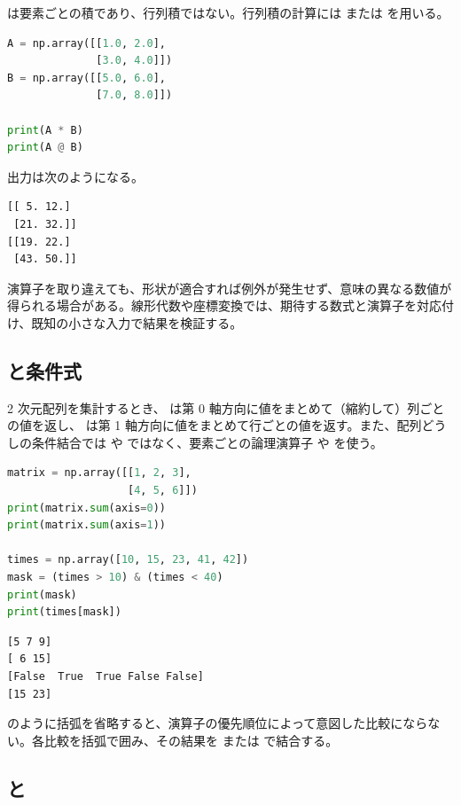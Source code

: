 \code{*} は要素ごとの積であり、行列積ではない。行列積の計算には  または  を用いる。

\begin{lstlisting}[language=Python]
A = np.array([[1.0, 2.0],
              [3.0, 4.0]])
B = np.array([[5.0, 6.0],
              [7.0, 8.0]])

print(A * B)
print(A @ B)
\end{lstlisting}

出力は次のようになる。

\begin{lstlisting}[numbers=none, xleftmargin=2\zw]
[[ 5. 12.]
 [21. 32.]]
[[19. 22.]
 [43. 50.]]
\end{lstlisting}

演算子を取り違えても、形状が適合すれば例外が発生せず、意味の異なる数値が得られる場合がある。線形代数や座標変換では、期待する数式と演算子を対応付け、既知の小さな入力で結果を検証する。

\subsection{ と条件式}

2 次元配列を集計するとき、 は第 0 軸方向に値をまとめて（縮約して）列ごとの値を返し、 は第 1 軸方向に値をまとめて行ごとの値を返す。また、配列どうしの条件結合では  や  ではなく、要素ごとの論理演算子 \code{\&} や \code{|} を使う。

\begin{lstlisting}[language=Python]
matrix = np.array([[1, 2, 3],
                   [4, 5, 6]])
print(matrix.sum(axis=0))
print(matrix.sum(axis=1))

times = np.array([10, 15, 23, 41, 42])
mask = (times > 10) & (times < 40)
print(mask)
print(times[mask])
\end{lstlisting}

\begin{lstlisting}[numbers=none, xleftmargin=2\zw]
[5 7 9]
[ 6 15]
[False  True  True False False]
[15 23]
\end{lstlisting}

 のように括弧を省略すると、演算子の優先順位によって意図した比較にならない。各比較を括弧で囲み、その結果を \code{\&} または \code{|} で結合する。

\subsection{ と }

